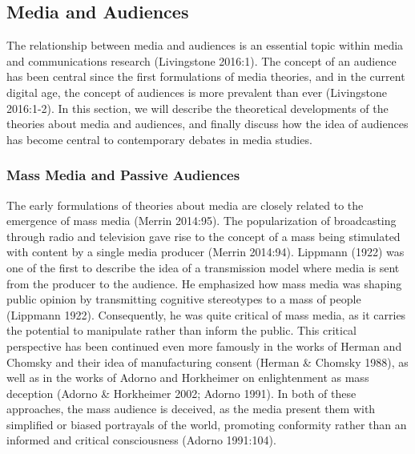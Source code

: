 \documentclass[
]{article}
\begin{document}
\hypertarget{media-and-audiences}{%
\subsection{Media and Audiences}\label{media-and-audiences}}

The relationship between media and audiences is an essential topic
within media and communications research (Livingstone 2016:1). The
concept of an audience has been central since the first formulations of
media theories, and in the current digital age, the concept of audiences
is more prevalent than ever (Livingstone 2016:1-2). In this section, we
will describe the theoretical developments of the theories about media
and audiences, and finally discuss how the idea of audiences has become
central to contemporary debates in media studies.

\hypertarget{mass-media-and-passive-audiences}{%
\subsubsection{Mass Media and Passive
Audiences}\label{mass-media-and-passive-audiences}}

\noindent The early formulations of theories about media are closely
related to the emergence of mass media (Merrin 2014:95). The
popularization of broadcasting through radio and television gave rise to
the concept of a mass being stimulated with content by a single media
producer (Merrin 2014:94). Lippmann (1922) was one of the first to
describe the idea of a transmission model where media is sent from the
producer to the audience. He emphasized how mass media was shaping
public opinion by transmitting cognitive stereotypes to a mass of people
(Lippmann 1922). Consequently, he was quite critical of mass media, as
it carries the potential to manipulate rather than inform the public.
This critical perspective has been continued even more famously in the
works of Herman and Chomsky and their idea of manufacturing consent
(Herman \& Chomsky 1988), as well as in the works of Adorno and
Horkheimer on enlightenment as mass deception (Adorno \& Horkheimer
2002; Adorno 1991). In both of these approaches, the mass audience is
deceived, as the media present them with simplified or biased portrayals
of the world, promoting conformity rather than an informed and critical
consciousness (Adorno 1991:104).
\end{document}

